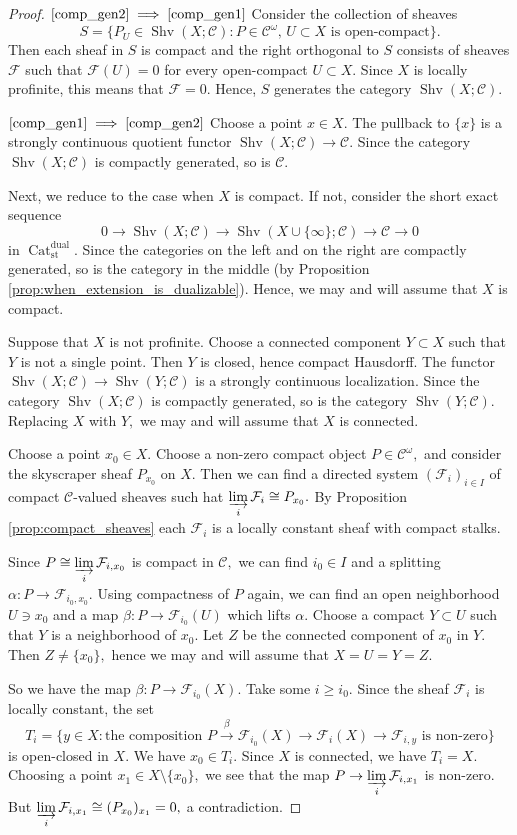 \documentclass[11pt,leqno]{amsart}
\newcommand{\Implies}[2]{$\text{\ref{#1}}\implies\text{\ref{#2}}$}
\numberwithin{equation}{section}
\newcommand{\indlim}[1][]{\mathop{\varinjlim}\limits_{#1}}
\newcommand{\xto}{\xrightarrow}
\newcommand{\Cat}{\operatorname{Cat}}
\newcommand{\st}{\operatorname{st}}
\newcommand{\dual}{\operatorname{dual}}
\newcommand{\cF}{{\mathcal F}}
\newcommand{\cC}{{\mathcal C}}
\newcommand{\Sh}{\operatorname{Shv}}
\begin{document}
\begin{proof} \Implies{comp_gen2}{comp_gen1} Consider the collection of sheaves $$S=\{P_U\in\Sh(X;\cC): P\in\cC^{\omega},\,U\subset X\text{ is open-compact}\}.$$ 
Then each sheaf in $S$ is compact and the right orthogonal to $S$ consists of sheaves $\cF$ such that $\cF(U)=0$ for every open-compact $U\subset X.$ Since $X$ is locally profinite, this means that $\cF=0.$ Hence, $S$ generates the category $\Sh(X;\cC).$

\Implies{comp_gen1}{comp_gen2} Choose a point $x\in X.$ The pullback to $\{x\}$ is a strongly continuous quotient functor $\Sh(X;\cC)\to\cC.$ Since the category $\Sh(X;\cC)$ is compactly generated, so is $\cC.$

Next, we reduce to the case when $X$ is compact. If not, consider the short exact sequence
$$0\to \Sh(X;\cC)\to \Sh(X\cup\{\infty\};\cC)\to\cC\to 0$$
in $\Cat_{\st}^{\dual}.$ Since the categories on the left and on the right are compactly generated, so is the category in the middle (by Proposition \ref{prop:when_extension_is_dualizable}). Hence, we may and will assume that $X$ is compact.

Suppose that $X$ is not profinite. Choose a connected component $Y\subset X$ such that $Y$ is not a single point. Then $Y$ is closed, hence compact Hausdorff. The functor $\Sh(X;\cC)\to\Sh(Y;\cC)$ is a strongly continuous localization. Since the category $\Sh(X;\cC)$ is compactly generated, so is the category $\Sh(Y;\cC).$ Replacing $X$ with $Y,$ we may and will assume that $X$ is connected.

Choose a point $x_0\in X.$ Choose a non-zero compact object $P\in\cC^{\omega},$ and consider the skyscraper sheaf $P_{x_0}$ on $X.$ Then we can find a directed system $(\cF_i)_{i\in I}$ of compact $\cC$-valued sheaves such hat $\indlim[i]\cF_i\cong P_{x_0}.$ By Proposition \ref{prop:compact_sheaves} each $\cF_i$ is a locally constant sheaf with compact stalks. 

Since $P\cong\indlim[i]\cF_{i,x_0}$ is compact in $\cC,$ we can find $i_0\in I$ and a splitting $\alpha:P\to \cF_{i_0,x_0}.$ 
Using compactness of $P$ again, we can find an open neighborhood $U\ni x_0$ and a map $\beta:P\to\cF_{i_0}(U)$ which lifts $\alpha.$ Choose a compact $Y\subset U$ such that $Y$ is a neighborhood of $x_0.$ Let $Z$ be the connected component of $x_0$ in $Y.$ Then $Z\neq\{x_0\},$ hence we may and will assume that $X=U=Y=Z.$

So we have the map $\beta:P\to\cF_{i_0}(X).$ Take some $i\geq i_0.$ Since the sheaf $\cF_i$ is locally constant, the set
$$T_i=\{y\in X: \text{the composition }P\xto{\beta}\cF_{i_0}(X)\to\cF_i(X)\to\cF_{i,y}\text{ is non-zero}\}$$
is open-closed in $X.$ We have $x_0\in T_i.$ Since $X$ is connected, we have $T_i=X.$ Choosing a point $x_1\in X\setminus\{x_0\},$ we see that the map $P\to\indlim[i]\cF_{i,x_1}$ is non-zero. But $\indlim[i]\cF_{i,x_1}\cong (P_{x_0})_{x_1}=0,$ a contradiction.  
\end{proof}
\end{document}
